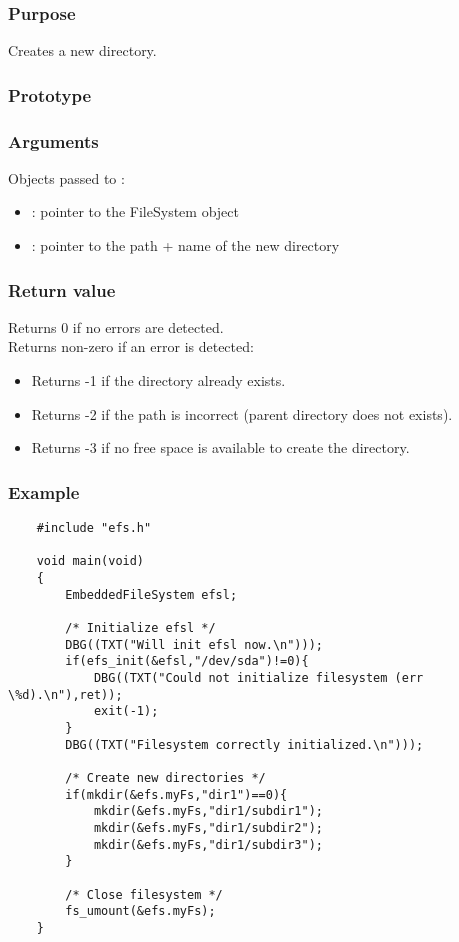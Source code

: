 \subsubsection*{Purpose}
Creates a new directory.
\subsubsection*{Prototype}
\subsubsection*{Arguments}
Objects passed to :
\begin{itemize}
	\item{: pointer to the FileSystem object}
	\item{: pointer to the path + name of the new directory}
\end{itemize}
\subsubsection*{Return value}
Returns 0 if no errors are detected.\\
\newline
Returns non-zero if an error is detected:
\begin{itemize}
	\item{Returns -1 if the directory already exists.}
	\item{Returns -2 if the path is incorrect (parent directory does not exists).}
	\item{Returns -3 if no free space is available to create the directory.}
\end{itemize}
\subsubsection*{Example}
\lstset{numbers=left, stepnumber=1, numberstyle=\small, numbersep=5pt, tabsize=4}
\begin{lstlisting}
	#include "efs.h"

	void main(void)
	{
		EmbeddedFileSystem efsl;

		/* Initialize efsl */
		DBG((TXT("Will init efsl now.\n")));
		if(efs_init(&efsl,"/dev/sda")!=0){
			DBG((TXT("Could not initialize filesystem (err \%d).\n"),ret));
			exit(-1);
		}
		DBG((TXT("Filesystem correctly initialized.\n")));

		/* Create new directories */
		if(mkdir(&efs.myFs,"dir1")==0){
			mkdir(&efs.myFs,"dir1/subdir1");
			mkdir(&efs.myFs,"dir1/subdir2");
			mkdir(&efs.myFs,"dir1/subdir3");
		}
		
		/* Close filesystem */
		fs_umount(&efs.myFs);
	}
\end{lstlisting}
